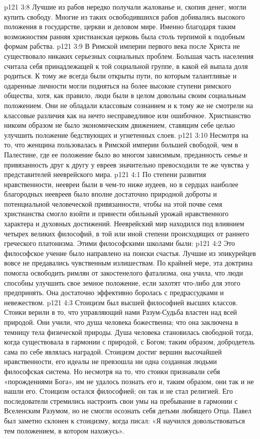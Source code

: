 \vs p121 3:8 Лучшие из рабов нередко получали жалованье и, скопив денег, могли купить свободу. Многие из таких освободившихся рабов добивались высокого положения в государстве, церкви и деловом мире. Именно благодаря таким возможностям ранняя христианская церковь была столь терпимой к подобным формам рабства.
\vs p121 3:9 \pc В Римской империи первого века после Христа не существовало никаких серьезных социальных проблем. Большая часть населения считала себя принадлежащей к той социальной группе, в какой ей выпала доля родиться. К тому же всегда были открыты пути, по которым талантливые и одаренные личности могли подняться на более высокие ступени римского общества, хотя, как правило, люди были в целом довольны своим социальным положением. Они не обладали классовым сознанием и к тому же не смотрели на классовые различия как на нечто несправедливое или ошибочное. Христианство никоим образом не было экономическим движением, ставящим себе целью улучшить положение бедствующих и угнетенных слоев.
\vs p121 3:10 Несмотря на то, что женщина пользовалась в Римской империи большей свободой, чем в Палестине, где ее положение было во многом зависимым, преданность семье и привязанность друг к другу у евреев значительно превосходили те же чувства у представителей нееврейского мира.
\vs p121 4:1 По степени развития нравственности, неевреи были в чем\hyp{}то ниже иудеев, но в сердцах наиболее благородных неевреев было вполне достаточно природной доброты и потенциальной человеческой привязанности, чтобы на этой почве семя христианства смогло взойти и принести обильный урожай нравственного характера и духовных достижений. Нееврейский мир находился под влиянием четырех великих философий, в той или иной степени происходящих от раннего греческого платонизма. Этими философскими школами были:
\vs p121 4:2 \bibnobreakspace {} Это философское учение было направлено на поиски счастья. Лучшие из эпикурейцев вовсе не предавались чувственным излишествам. По крайней мере, эта доктрина помогла освободить римлян от закостенелого фатализма, она учила, что люди способны улучшить свое земное положение, если захотят что\hyp{}либо для этого предпринять. Она достаточно эффективно боролась с предрассудками и невежеством.
\vs p121 4:3 \pc {}\bibnobreakspace {} Стоицизм был высшей философией высших классов. Стоики верили в то, что управляющий нами Разум\hyp{}Судьба властен над всей природой. Они учили, что душа человека божественна; что она заключена в темницу тела физической природы. Душа человека становилась свободной тогда, когда существовала в гармонии с природой, с Богом; таким образом, добродетель сама по себе являлась наградой. Стоицизм достиг вершин высочайшей нравственности, его идеалы не превзошла ни одна созданная людьми философская система. Но несмотря на то, что стоики признавали себя «порождениями Бога», им не удалось познать его и, таким образом, они так и не нашли его. Стоицизм остался философией; он так и не стал религией. Его последователи стремились настроить свои умы на пребывание в гармонии с Вселенским Разумом, но не смогли осознать себя детьми любящего Отца. Павел был заметно склонен к стоицизму, когда писал: «Я научился довольствоваться тем положением, в котором нахожусь».
